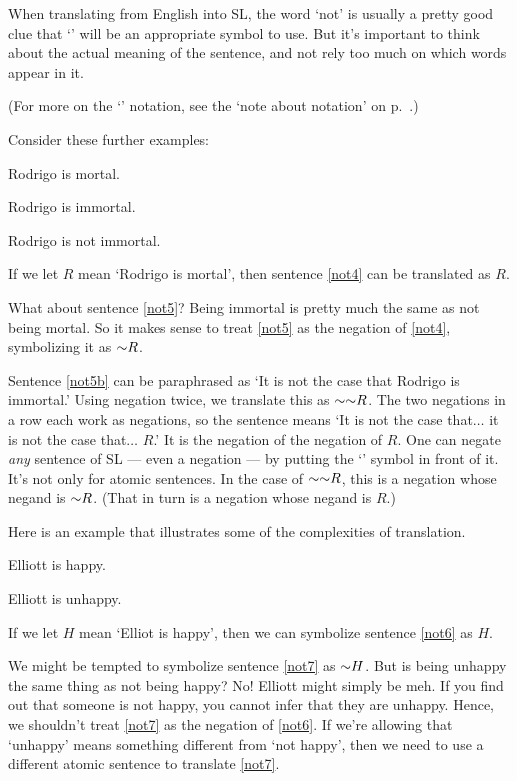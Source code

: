 When translating from English into SL, the word `not' is usually a pretty good clue that `\enot' will be an appropriate symbol to use. But it's important to think about the actual meaning of the sentence, and not rely too much on which words appear in it.


(For more on the `\metaA{}' notation, see the `note about notation' on p.\ \pageref{notationnote}.)

Consider these further examples:
\begin{earg}
\item[\ex{not4}] Rodrigo is mortal.
\item[\ex{not5}] Rodrigo is immortal.
\item[\ex{not5b}] Rodrigo is not immortal.
\end{earg}

If we let $R$ mean `Rodrigo is mortal', then sentence \ref{not4} can be translated as $R$.

What about sentence \ref{not5}? Being immortal is pretty much the same as not being mortal. So it makes sense to treat \ref{not5} as the negation of \ref{not4}, symbolizing it as $\enot{R}$.

Sentence \ref{not5b} can be paraphrased as `It is not the case that Rodrigo is immortal.' Using negation twice, we translate this as $\enot \enot R$. The two negations in a row each work as negations, so the sentence means `It is not the case that$\ldots$ it is not the case that$\ldots$ $R$.' It is the negation of the negation of $R$. One can negate \emph{any} sentence of SL --- even a negation --- by putting the `\enot{}' symbol in front of it. It's not only for atomic sentences. In the case of $\enot\enot R$, this is a negation whose negand is $\enot R$. (That in turn is a negation whose negand is $R$.)

Here is an example that illustrates some of the complexities of translation.
\begin{earg}
\item[\ex{not6}] Elliott is happy.
\item[\ex{not7}] Elliott is unhappy.
\end{earg}

If we let $H$ mean `Elliot is happy', then we can symbolize sentence \ref{not6} as $H$.

We might be tempted to symbolize sentence \ref{not7} as $\enot{H}$. But is being unhappy the same thing as not being happy? {\color{black}No! Elliott might simply be meh. If you find out that someone is not happy, you cannot infer that they are unhappy. Hence,} we shouldn't treat \ref{not7} as the negation of \ref{not6}. If we're allowing that `unhappy' means something different from `not happy', then we need to use a different atomic sentence to translate \ref{not7}.

